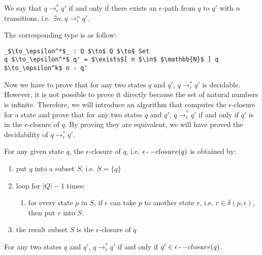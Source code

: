 \begin{defn}
\noindent We say that \(q \to_\epsilon^* q'\) if and only if there
exists an \(\epsilon\)-path from \(q\) to \(q'\) with \(n\) transitions, i.e. \(\exists n.\ q \to_\epsilon^n q'\). 
\end{defn}

\par The corresponding type is as follow: 
\begin{lstlisting}[mathescape=true,xleftmargin=.3\textwidth]
_$\to_\epsilon^*$_ : Q $\to$ Q $\to$ Set
q $\to_\epsilon^*$ q' = $\exists$[ n $\in$ $\mathbb{N}$ ] q $\to_\epsilon^k$ n - q'
\end{lstlisting}

\par Now we have to prove that for any two states \(q\) and \(q'\), 
\(q \to_\epsilon^* q'\) is decidable. However, it is not possible to
prove it directly because the set of natural numbers is
infinite. Therefore, we will introduce an algorithm that computes the
\(\epsilon\)-closure for a state and prove that for any two states
\(q\) and \(q'\), \(q \to_\epsilon^* q'\) if and only if \(q'\) is in
the \(\epsilon\)-closure of \(q\). By proving they are equivalent, we
will have proved the decidability of \(q \to_\epsilon^* q'\). 

\begin{defn}
\noindent For any given state \(q\), the \(\epsilon\)-closure of
\(q\), i.e. \(\epsilon\operatorname{-} -closure(q)\) is obtained by: 
\begin{enumerate}[nolistsep]
  \item put \(q\) into a subset \(S\), i.e. \(S = \{q\}\)
  \item loop for \(|Q| - 1\) times: 
  \begin{enumerate}
    \item for every state \(p\) in \(S\), if \(\epsilon\) can take
      \(p\) to another state \(r\), i.e. \(r \in
        \delta (p,\epsilon)\), then put \(r\) into \(S\). 
  \end{enumerate}
  \item the result subset \(S\) is the \(\epsilon\)-closure of \(q\)
\end{enumerate}
\end{defn}

\begin{lem}
\noindent For any two states \(q\) and \(q'\), \(q \to_\epsilon^* q'\)
if and only if \(q' \in \epsilon\operatorname{-} -closure(q)\). 
\end{lem}

